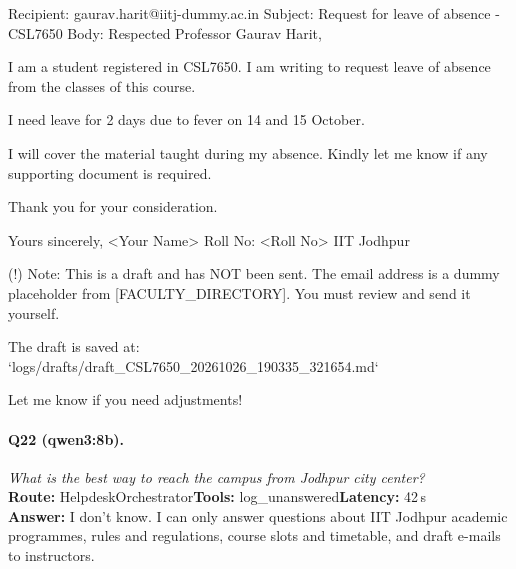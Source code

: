 Recipient: gaurav.harit@iitj-dummy.ac.in  
Subject: Request for leave of absence - CSL7650  
Body:  
Respected Professor Gaurav Harit,  

I am a student registered in CSL7650. I am writing to request leave of absence from the classes of this course.  

I need leave for 2 days due to fever on 14 and 15 October.  

I will cover the material taught during my absence. Kindly let me know if any supporting document is required.  

Thank you for your consideration.  

Yours sincerely,  
<Your Name>  
Roll No: <Roll No>  
IIT Jodhpur  

(!) Note: This is a draft and has NOT been sent. The email address is a dummy placeholder from [FACULTY\_DIRECTORY]. You must review and send it yourself.  

The draft is saved at: `logs/drafts/draft\_CSL7650\_20261026\_190335\_321654.md`  

Let me know if you need adjustments!

\paragraph{Q22 (qwen3:8b).} \emph{What is the best way to reach the campus from Jodhpur city center?}\\
\textbf{Route:} HelpdeskOrchestrator\quad \textbf{Tools:} log\_unanswered\quad \textbf{Latency:} 42\,s\\
\textbf{Answer:} I don't know. I can only answer questions about IIT Jodhpur academic programmes, rules and regulations, course slots and timetable, and draft e-mails to instructors.

